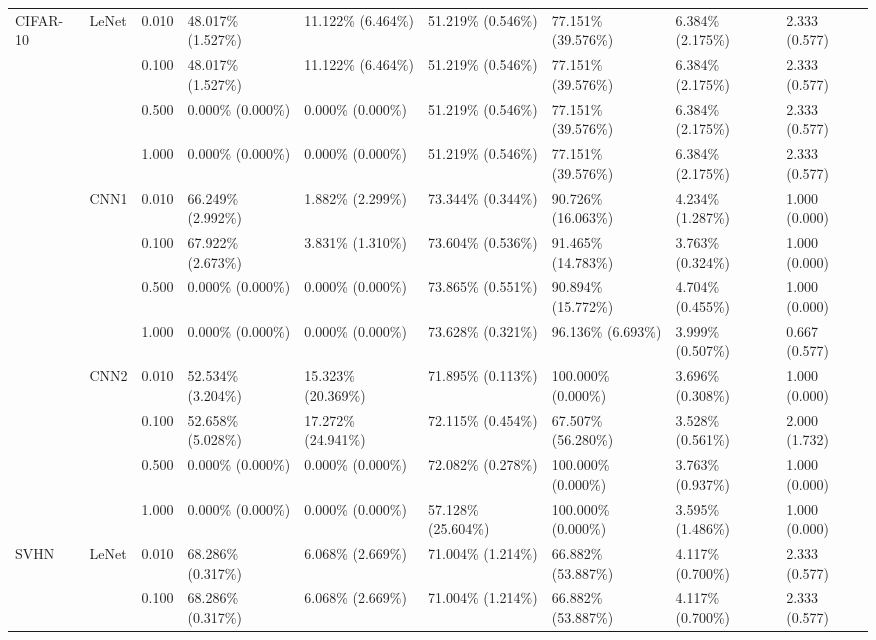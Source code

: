 \documentclass[conference,compsoc]{IEEEtran}
\begin{document}
\begin{landscape}
\begin{table}[H]
\begin{tabular}{lllllllll}
\hline
\multirow{12}{*}{CIFAR-10} & \multirow{4}{*}{LeNet} & 0.010 & 48.017\% (1.527\%) & 11.122\% (6.464\%) & 51.219\% (0.546\%) & 77.151\% (39.576\%) & 6.384\% (2.175\%) & 2.333 (0.577) \\
& & 0.100 & 48.017\% (1.527\%) & 11.122\% (6.464\%) & 51.219\% (0.546\%) & 77.151\% (39.576\%) & 6.384\% (2.175\%) & 2.333 (0.577) \\
& & 0.500 & 0.000\% (0.000\%) & 0.000\% (0.000\%) & 51.219\% (0.546\%) & 77.151\% (39.576\%) & 6.384\% (2.175\%) & 2.333 (0.577) \\
& & 1.000 & 0.000\% (0.000\%) & 0.000\% (0.000\%) & 51.219\% (0.546\%) & 77.151\% (39.576\%) & 6.384\% (2.175\%) & 2.333 (0.577) \\
\cline{2-9}
& \multirow{4}{*}{CNN1} & 0.010 & 66.249\% (2.992\%) & 1.882\% (2.299\%) & 73.344\% (0.344\%) & 90.726\% (16.063\%) & 4.234\% (1.287\%) & 1.000 (0.000) \\
& & 0.100 & 67.922\% (2.673\%) & 3.831\% (1.310\%) & 73.604\% (0.536\%) & 91.465\% (14.783\%) & 3.763\% (0.324\%) & 1.000 (0.000) \\
& & 0.500 & 0.000\% (0.000\%) & 0.000\% (0.000\%) & 73.865\% (0.551\%) & 90.894\% (15.772\%) & 4.704\% (0.455\%) & 1.000 (0.000) \\
& & 1.000 & 0.000\% (0.000\%) & 0.000\% (0.000\%) & 73.628\% (0.321\%) & 96.136\% (6.693\%) & 3.999\% (0.507\%) & 0.667 (0.577) \\
\cline{2-9}
& \multirow{4}{*}{CNN2} & 0.010 & 52.534\% (3.204\%) & 15.323\% (20.369\%) & 71.895\% (0.113\%) & 100.000\% (0.000\%) & 3.696\% (0.308\%) & 1.000 (0.000) \\
& & 0.100 & 52.658\% (5.028\%) & 17.272\% (24.941\%) & 72.115\% (0.454\%) & 67.507\% (56.280\%) & 3.528\% (0.561\%) & 2.000 (1.732) \\
& & 0.500 & 0.000\% (0.000\%) & 0.000\% (0.000\%) & 72.082\% (0.278\%) & 100.000\% (0.000\%) & 3.763\% (0.937\%) & 1.000 (0.000) \\
& & 1.000 & 0.000\% (0.000\%) & 0.000\% (0.000\%) & 57.128\% (25.604\%) & 100.000\% (0.000\%) & 3.595\% (1.486\%) & 1.000 (0.000) \\
\hline
\multirow{12}{*}{SVHN} & \multirow{4}{*}{LeNet} & 0.010 & 68.286\% (0.317\%) & 6.068\% (2.669\%) & 71.004\% (1.214\%) & 66.882\% (53.887\%) & 4.117\% (0.700\%) & 2.333 (0.577) \\
& & 0.100 & 68.286\% (0.317\%) & 6.068\% (2.669\%) & 71.004\% (1.214\%) & 66.882\% (53.887\%) & 4.117\% (0.700\%) & 2.333 (0.577) \\

\end{tabular}
\end{table}
\end{landscape}
\end{document}
